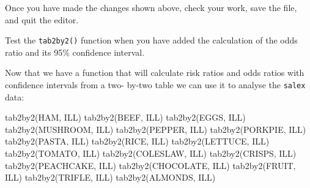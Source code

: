 \documentclass[
  12pt,
]{book}
\newenvironment{Shaded}{\begin{snugshade}}{\end{snugshade}}
\newcommand{\FunctionTok}[1]{\textcolor[rgb]{0.00,0.00,0.00}{#1}}
\newcommand{\NormalTok}[1]{#1}
\newcommand{\SpecialCharTok}[1]{\textcolor[rgb]{0.00,0.00,0.00}{#1}}
\newcommand{\StringTok}[1]{\textcolor[rgb]{0.31,0.60,0.02}{#1}}
\begin{document}
\begin{Shaded}
\end{Shaded}

Once you have made the changes shown above, check your work, save the file, and quit the editor.

\newpage

Test the \texttt{tab2by2()} function when you have added the calculation of the odds ratio and its 95\% confidence interval.

Now that we have a function that will calculate risk ratios and odds ratios with confidence intervals from a two- by-two table we can use it to analyse the \texttt{salex} data:

\begin{Shaded}
\begin{Highlighting}[]
\FunctionTok{tab2by2}\NormalTok{(HAM, ILL)}
\FunctionTok{tab2by2}\NormalTok{(BEEF, ILL)}
\FunctionTok{tab2by2}\NormalTok{(EGGS, ILL)}
\FunctionTok{tab2by2}\NormalTok{(MUSHROOM, ILL)}
\FunctionTok{tab2by2}\NormalTok{(PEPPER, ILL)}
\FunctionTok{tab2by2}\NormalTok{(PORKPIE, ILL)}
\FunctionTok{tab2by2}\NormalTok{(PASTA, ILL)}
\FunctionTok{tab2by2}\NormalTok{(RICE, ILL)}
\FunctionTok{tab2by2}\NormalTok{(LETTUCE, ILL)}
\FunctionTok{tab2by2}\NormalTok{(TOMATO, ILL)}
\FunctionTok{tab2by2}\NormalTok{(COLESLAW, ILL)}
\FunctionTok{tab2by2}\NormalTok{(CRISPS, ILL)}
\FunctionTok{tab2by2}\NormalTok{(PEACHCAKE, ILL)}
\FunctionTok{tab2by2}\NormalTok{(CHOCOLATE, ILL)}
\FunctionTok{tab2by2}\NormalTok{(FRUIT, ILL)}
\FunctionTok{tab2by2}\NormalTok{(TRIFLE, ILL)}
\FunctionTok{tab2by2}\NormalTok{(ALMONDS, ILL)}
\end{Highlighting}
\end{Shaded}
\end{document}
